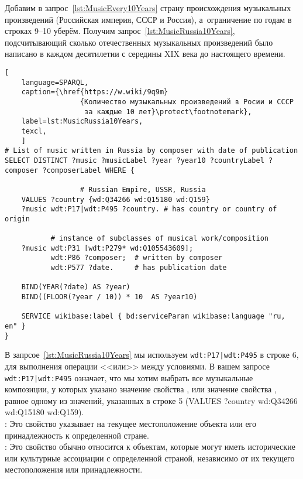 Добавим в запрос~\ref{lst:MusicEvery10Years} страну происхождения 
музыкальных произведений (Российская империя, СССР и Россия), 
а~ограничение по годам в строках 9--10 уберём. 
Получим запрос~\ref{lst:MusicRussia10Years}, 
подсчитывающий сколько отечественных музыкальных произведений было написано 
в каждом десятилетии с середины XIX века до настоящего времени.

\begin{lstlisting}[ 
    language=SPARQL,
    caption={\href{https://w.wiki/9q9m}
                  {Количество музыкальных произведений в Росии и СССР 
                   за каждые 10 лет}\protect\footnotemark},
    label=lst:MusicRussia10Years,
    texcl,
    ]
# List of music written in Russia by composer with date of publication
SELECT DISTINCT ?music ?musicLabel ?year ?year10 ?countryLabel ?composer ?composerLabel WHERE {
    
                  # Russian Empire, USSR, Russia
    VALUES ?country {wd:Q34266 wd:Q15180 wd:Q159}
    ?music wdt:P17|wdt:P495 ?country. # has country or country of origin  
    
           # instance of subclasses of musical work/composition
    ?music wdt:P31 [wdt:P279* wd:Q105543609];
           wdt:P86 ?composer;  # written by composer
           wdt:P577 ?date.     # has publication date
    
    BIND(YEAR(?date) AS ?year)
    BIND((FLOOR(?year / 10)) * 10  AS ?year10)
    
    SERVICE wikibase:label { bd:serviceParam wikibase:language "ru, en" }
}
\end{lstlisting}%

В запрсое~\ref{lst:MusicRussia10Years} мы используем \lstinline{wdt:P17|wdt:P495} в строке 6, 
для выполнения операции <<или>> между условиями. В вашем запросе \lstinline{wdt:P17|wdt:P495} 
означает, что мы хотим выбрать все музыкальные композиции, у которых указано значение свойства , 
или значение свойства , равное одному из значений, 
указанных в строке 5 (VALUES ?country {wd:Q34266 wd:Q15180 wd:Q159}).\\ 
: Это свойство указывает на текущее местоположение объекта 
или его принадлежность к определенной стране.\\ 
: Это свойство обычно относится к объектам, 
которые могут иметь исторические или культурные ассоциации с определенной страной, 
независимо от их текущего местоположения или принадлежности.

